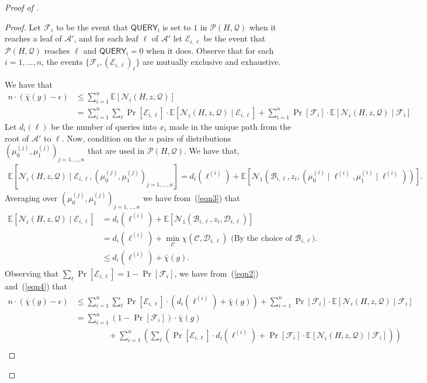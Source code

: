 \documentclass{toc}
\newcommand{\cA}{\mathcal{A}}
\newcommand{\clB}{\mathcal{B}}
\newcommand{\clC}{\mathcal{C}}
\newcommand{\clE}{\mathcal{E}}
\newcommand{\clQ}{\mathcal{Q}}
\newcommand{\clP}{\mathcal{P}}
\newcommand{\clN}{\mathcal{N}}
\newcommand{\clD}{\mathcal{D}}
\newcommand{\E}{\mathbb{E}}
\begin{document}
\begin{proof}[Proof of {}]
\begin{proof}
Let $\mathcal{F}_i$ to be the event that $\mathsf{QUERY_i}$ is set to $1$ in $\clP(H,\clQ)$ when it reaches a leaf of $\cA'$, and for each leaf $\ell$ of $\cA'$ let $\mathcal{E}_{i, \ell}$ be the event that $\clP(H,\clQ)$ reaches $\ell$ and 
$\mathsf{QUERY_i}=0$ when it does.   Observe that for each $i=1, \ldots, n$, the events $\{\mathcal{F}_i, (\mathcal{E}_{i,\ell})_{\ell}\}$ are mutually exclusive and exhaustive.  

We have that
\begin{align}
n \cdot (\bar \chi(g)-\epsilon) &\leq \sum_{i=1}^n\E[\clN_i(H,z,\clQ)] \nonumber \\
&=\sum_{i=1}^n\sum_{\ell}\Pr[\clE_{i,\ell}]\cdot \E[\clN_i(H,z,\clQ) \mid \clE_{i,\ell}]+\sum_{i=1}^n\Pr[\mathcal{F}_i]\cdot \E[\clN_i(H,z,\clQ) \mid \mathcal{F}_i] \label{eqn2}
\end{align}
Let $d_i(\ell)$ be the number of queries into $x_i$ made in the unique path from the root of $\cA'$ to $\ell$.
Now, condition on the $n$ pairs of distributions $(\mu_0^{(j)}, \mu_1^{(j)})_{j=1, \ldots, n}$ that are used in $\clP(H,\clQ)$.  We have that,
\begin{align}
\E[\clN_i(H,z,\clQ) \mid \clE_{i,\ell}, (\mu_0^{(j)}, \mu_1^{(j)})_{j=1, \ldots, n}]=d_i(\ell^{(i)})+\E[\clN_1(\clB_{i,\ell},z_i,(\mu_0^{(i)}\mid \ell^{(i)}, \mu_1^{(i)} \mid \ell^{(i)}))].\label{eqn3}
\end{align}
Averaging over $(\mu_0^{(j)}, \mu_1^{(j)})_{j=1, \ldots, n}$ we have from~(\ref{eqn3}) that
\begin{align}
\E[\clN_i(H,z,\clQ) \mid \clE_{i,\ell}] &= d_i(\ell^{(i)})+\E[\clN_1(\clB_{i,\ell},z_i,\clD_{i,\ell})]\nonumber \\
&= d_i(\ell^{(i)})+\min_{\clC}\chi(\clC, \clD_{i,\ell})\mbox{\ \ \ \ (By the choice of $\clB_{i,\ell}$)}. \nonumber \\
&\leq d_i(\ell^{(i)})+\bar \chi(g).\label{eqn4}
\end{align}
Observing that $\sum_{\ell}\Pr[\clE_{i, \ell}]=1-\Pr[\mathcal{F}_i]$, we have from~(\ref{eqn2}) and~(\ref{eqn4}) that
\begin{align}
n\cdot (\bar \chi(g)-\epsilon) &\leq  \sum_{i=1}^n \sum_{\ell}\Pr[\clE_{i, \ell}] \cdot (d_i(\ell^{(i)})+\bar \chi(g)) + \sum_{i=1}^n\Pr[\mathcal{F}_i]\cdot\E[\clN_i(H,z,\clQ) \mid \mathcal{F}_i]\nonumber \\
&= \sum_{i=1}^n (1-\Pr[\mathcal{F}_i]) \cdot \bar \chi(g)\nonumber \\
&\qquad \qquad +\sum_{i=1}^n\left(\sum_{\ell}(\Pr[\clE_{i,\ell}]\cdot d_i(\ell^{(i)})+\Pr[\mathcal{F}_i]\cdot \E[\clN_i(H,z,\clQ) \mid \mathcal{F}_i])\right) \nonumber \\

\end{align}
\end{proof}
\end{proof}
\end{document}
